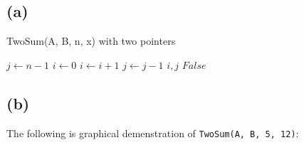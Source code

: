 \documentclass[12pt]{article}
\newcommand{\inlinecode}{\texttt}
\begin{document}
\subsection{(a)}

\begin{algorithm}
\caption{TwoSum(A, B, n, x) with two pointers}\label{TwoSum}
\begin{algorithmic}[1]
\Procedure{}{}
\State $j \gets n-1$
\State $i \gets 0$
        \State $i \gets i + 1$
        \State $j \gets j - 1$
    \Else
        \State \Return $i, j$
    \EndIf
\EndWhile
\State \Return $False$
\EndProcedure
\end{algorithmic}
\end{algorithm}

\newpage

\subsection{(b)}

The following is graphical demenstration of \inlinecode{TwoSum(A, B, 5, 12)}:
\end{document}
